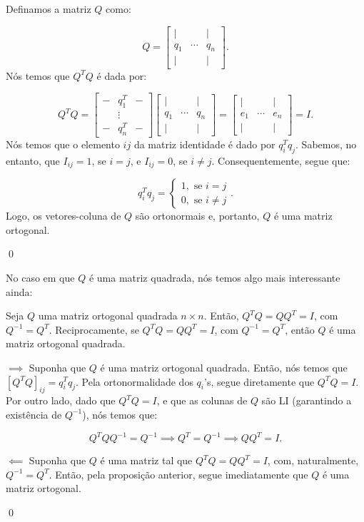 \begin{Proof}
	Definamos a matriz $Q$ como:
	
	$$
	Q = \begin{bmatrix}
		| & & | \\
		q_1 & \cdots & q_n \\
		| & & |
	\end{bmatrix}.
	$$
	Nós temos que $Q^TQ$ é dada por:
	
	$$
	Q^TQ = \begin{bmatrix}
		- & q_1^T & - \\
		& \vdots &  \\
		- & q_n^T & -
	\end{bmatrix}\begin{bmatrix}
		| & & | \\
		q_1 & \cdots & q_n \\
		| & & |
	\end{bmatrix} = \begin{bmatrix}
		| & & | \\
		e_1 & \cdots & e_n \\
		| & & |
	\end{bmatrix} = I.
	$$
	Nós temos que o elemento $ij$ da matriz identidade é dado por $q_i^Tq_j$. Sabemos, no entanto, que $I_{ij} = 1$, se $i = j$, e $I_{ij} = 0$, se $i\neq j$. Consequentemente, segue que:
	
	$$
	q_i^Tq_j = \begin{cases}
		1, \text{ se $i = j$} \\
		0, \text{ se $i\neq j$}
	\end{cases}.
	$$
	Logo, os vetores-coluna de $Q$ são ortonormais e, portanto, $Q$ é uma matriz ortogonal.
	
	\qed
\end{Proof}

No caso em que $Q$ é uma matriz quadrada, nós temos algo mais interessante ainda:

\begin{Proposition}
	Seja $Q$ uma matriz ortogonal quadrada $n\times n$. Então, $Q^TQ = QQ^T = I$, com $Q^{-1} = Q^T$. Reciprocamente, se $Q^TQ = QQ^T = I$, com $Q^{-1} = Q^T$, então $Q$ é uma matriz ortogonal quadrada.
\end{Proposition}

\begin{Proof}
	$\implies$ Suponha que $Q$ é uma matriz ortogonal quadrada. Então, nós temos que $[Q^TQ]_{ij} = q_i^Tq_j$. Pela ortonormalidade dos $q_i$'s, segue diretamente que $Q^TQ = I$. Por outro lado, dado que $Q^TQ = I$, e que as colunas de $Q$ são LI (garantindo a existência de $Q^{-1}$), nós temos que:
	
	$$
	Q^TQQ^{-1} = Q^{-1}\implies Q^T = Q^{-1}\implies QQ^T = I.
	$$
	
	$\impliedby$ Suponha que $Q$ é uma matriz tal que $Q^TQ = QQ^T = I$, com, naturalmente, $Q^{-1} = Q^T$. Então, pela proposição anterior, segue imediatamente que $Q$ é uma matriz ortogonal.
	
	\qed
\end{Proof}

